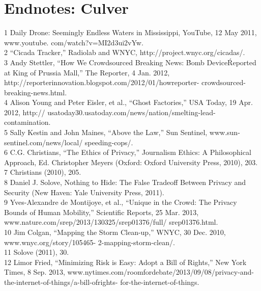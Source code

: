 \section{Endnotes: Culver}
1 Daily Drone: Seemingly Endless Waters in Mississippi, YouTube, 12 May 2011, www.youtube.
com/watch?v=MI2d3ui2vYw.\\
2 ``Cicada Tracker,'' Radiolab and WNYC, http://project.wnyc.org/cicadas/.\\
3 Andy Stettler, ``How We Crowdsourced Breaking News: \'Bomb Device\' Reported at King of
Prussia Mall,'' The Reporter, 4 Jan. 2012, http://reporterinnovation.blogspot.com/2012/01/howreporter-
crowdsourced-breaking-news.html.\\
4 Alison Young and Peter Eisler, et al., ``Ghost Factories,'' USA Today, 19 Apr. 2012, http://
usatoday30.usatoday.com/news/nation/smelting-lead-contamination.\\
5 Sally Kestin and John Maines, ``Above the Law,'' Sun Sentinel, www.sun-sentinel.com/news/local/
speeding-cops/.\\
6 C.G. Christians, ``The Ethics of Privacy,'' Journalism Ethics: A Philosophical Approach, Ed.
Christopher Meyers (Oxford: Oxford University Press, 2010), 203.\\
7 Christians (2010), 205.\\
8 Daniel J. Solove, Nothing to Hide: The False Tradeoff Between Privacy and Security (New Haven:
Yale University Press, 2011).\\
9 Yves-Alexandre de Montijoye, et al., ``Unique in the Crowd: The Privacy Bounds of Human
Mobility,'' Scientific Reports, 25 Mar. 2013, www.nature.com/srep/2013/130325/srep01376/full/
srep01376.html.\\
10 Jim Colgan, ``Mapping the Storm Clean-up,'' WNYC, 30 Dec. 2010, www.wnyc.org/story/105465-
2-mapping-storm-clean/.\\
11 Solove (2011), 30.\\
12 Limor Fried, ``Minimizing Risk is Easy: Adopt a Bill of Rights,'' New York Times, 8 Sep. 2013,
www.nytimes.com/roomfordebate/2013/09/08/privacy-and-the-internet-of-things/a-bill-ofrights-
for-the-internet-of-things.\\



